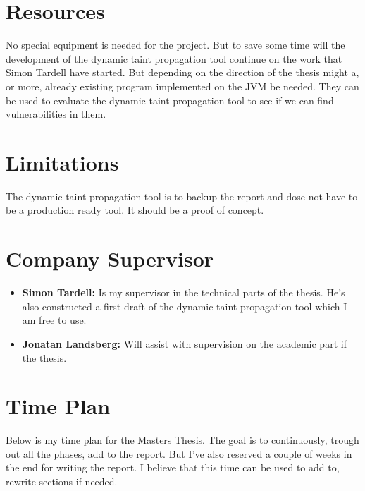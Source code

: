 \documentclass{../kththesis}
\begin{document}
\section{Resources}
No special equipment is needed for the project. But to save some time will the development of the dynamic taint propagation tool continue on the work that Simon Tardell have started. But depending on the direction of the thesis might a, or more, already existing program implemented on the JVM be needed. They can be used to evaluate the dynamic taint propagation tool to see if we can find vulnerabilities in them.


\section{Limitations}
The dynamic taint propagation tool is to backup the report and dose not have to be a production ready tool. It should be a proof of concept. 


\section{Company Supervisor}
\begin{itemize}
	\item \textbf{Simon Tardell:} Is my supervisor in the technical parts of the thesis. He's also constructed a first draft of the dynamic taint propagation tool which I am free to use.
	\item \textbf{Jonatan Landsberg:} Will assist with supervision on the academic part if the thesis.
\end{itemize}


\section{Time Plan}
Below is my time plan for the Masters Thesis. The goal is to continuously, trough out all the phases, add to the report. But I've also reserved a couple of weeks in the end for writing the report. I believe that this time can be used to add to, rewrite sections if needed.  \\ \\
\end{document}
